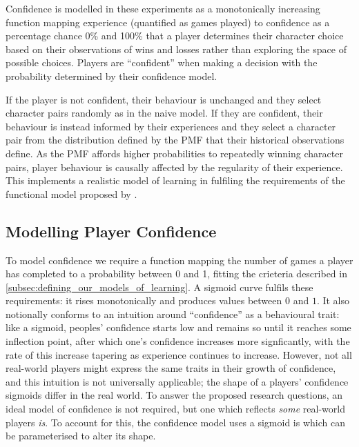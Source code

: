 Confidence is modelled in these experiments as a monotonically increasing
function mapping experience (quantified as games played) to confidence as
a percentage chance 0\% and 100\% that a player determines their
character choice based on their observations of wins and losses rather than
exploring the space of possible choices. Players are ``confident'' when making a
decision with the probability determined by their confidence model.

If the player is not confident, their behaviour is unchanged and they select
character pairs randomly as in the naive model. If they are confident, their
behaviour is instead informed by their experiences and they select a character
pair from the distribution defined by the PMF that their historical observations
define. As the PMF affords higher probabilities to repeatedly winning character
pairs, player behaviour is causally affected by the regularity of their
experience. This implements a realistic model of learning in fulfiling the
requirements of the functional model proposed by \citet{lachman1997learning}.

\subsection{Modelling Player Confidence}\label{subsec:confidence_model}

To model confidence we require a function mapping the number of games a player
has completed to a probability between 0 and 1, fitting the crieteria described
in \cref{subsec:defining_our_models_of_learning}. A sigmoid curve fulfils these
requirements: it rises monotonically and produces values between $0$ and $1$. It
also notionally conforms to an intuition around ``confidence'' as a behavioural
trait: like a sigmoid, peoples' confidence starts low and remains so until it
reaches some inflection point, after which one's confidence increases more
signficantly, with the rate of this increase tapering as experience continues to
increase. However, not all real-world players might express the same traits in
their growth of confidence, and this intuition is not universally applicable;
the shape of a players' confidence sigmoids differ in the real world. To answer
the proposed research questions, an ideal model of confidence is not required,
but one which reflects \emph{some} real-world players \emph{is}. To account
for this, the confidence model uses a sigmoid is which can be parameterised to
alter its shape.

